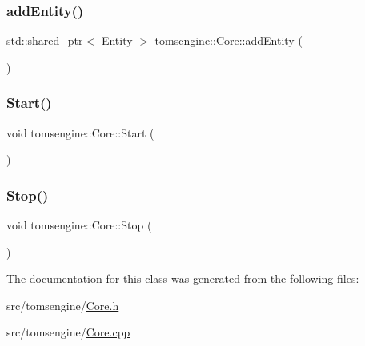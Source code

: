 \subsubsection{\texorpdfstring{add\+Entity()}{addEntity()}}
{\footnotesize\ttfamily std\+::shared\+\_\+ptr$<$ \mbox{\hyperlink{classtomsengine_1_1_entity}{Entity}} $>$ tomsengine\+::\+Core\+::add\+Entity (\begin{DoxyParamCaption}{ }\end{DoxyParamCaption})}

\mbox{\label{classtomsengine_1_1_core_ad5e2c3d2900bef9155f9ee97eb9cdce4}} 
\subsubsection{\texorpdfstring{Start()}{Start()}}
{\footnotesize\ttfamily void tomsengine\+::\+Core\+::\+Start (\begin{DoxyParamCaption}{ }\end{DoxyParamCaption})}

\mbox{\label{classtomsengine_1_1_core_a556fb0bd37ba3cef6a2b691f306538e6}} 
\subsubsection{\texorpdfstring{Stop()}{Stop()}}
{\footnotesize\ttfamily void tomsengine\+::\+Core\+::\+Stop (\begin{DoxyParamCaption}{ }\end{DoxyParamCaption})}



The documentation for this class was generated from the following files\+:\begin{DoxyCompactItemize}
\item 
src/tomsengine/\mbox{\hyperlink{_core_8h}{Core.\+h}}\item 
src/tomsengine/\mbox{\hyperlink{_core_8cpp}{Core.\+cpp}}\end{DoxyCompactItemize}
